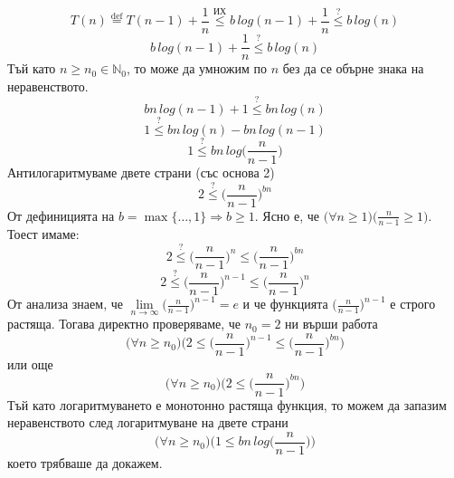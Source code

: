 \begin{solution}
\begin{itemize}
\begin{indstep}
			\begin{equation*}
				T(n)\overset{\text{def}}{=}T(n-1)+\frac1n\overset{\text{ИХ}}{\le}b\,log(n-1)+\frac1n\overset{?}{\le}b\,log(n)
			\end{equation*}
			\begin{equation*}
				b\,log(n-1)+\frac1n\overset{?}{\le}b\,log(n)
			\end{equation*}
			Тъй като $n\ge n_0\in\mathbb{N}_0$, то може да умножим по $n$ без да се обърне знака на неравенството.
			\begin{equation*}
				bn\,log(n-1)+1\overset{?}{\le}bn\,log(n)
			\end{equation*}
			\begin{equation*}
				1\overset{?}{\le}bn\,log(n)-bn\,log(n-1)
			\end{equation*}
			\begin{equation*}
				1\overset{?}{\le}bn\,log\bigg(\frac{n}{n-1}\bigg)
			\end{equation*}
			Антилогаритмуваме двете страни (със основа 2)
			\begin{equation*}
				2\overset{?}{\le}\bigg(\frac{n}{n-1}\bigg)^{bn}
			\end{equation*}
			От дефиницията на $b\!=\!\max\{\dots,1\}\Rightarrow b\ge1$. Ясно е, че $\big(\forall n\ge1\big)\big(\frac{n}{n-1}\ge1\big)$. Тоест имаме:
			\begin{equation*}
				2\overset{?}{\le}\bigg(\frac{n}{n-1}\bigg)^n\le\bigg(\frac{n}{n-1}\bigg)^{bn}
			\end{equation*}
			\begin{equation*}
				2\overset{?}{\le}\bigg(\frac{n}{n-1}\bigg)^{n-1}\le\bigg(\frac{n}{n-1}\bigg)^n
			\end{equation*}
			От анализа знаем, че $\lim\limits_{n\to\infty}\big(\frac{n}{n-1}\big)^{n-1}=e$ и че функцията $\big(\frac{n}{n-1}\big)^{n-1}$ е строго растяща. Тогава директно проверяваме, че $n_0=2$ ни върши работа%
			\begin{equation*}
				\big(\forall n\ge n_0\big)\Bigg(2\le\bigg(\frac{n}{n-1}\bigg)^{n-1}\le\bigg(\frac{n}{n-1}\bigg)^{bn}\Bigg)
			\end{equation*}
			или още
			\begin{equation*}
				\big(\forall n\ge n_0\big)\Bigg(2\le\bigg(\frac{n}{n-1}\bigg)^{bn}\Bigg)
			\end{equation*}
			Тъй като логаритмуването е монотонно растяща функция, то можем да запазим неравенството след логаритмуване на двете страни
			\begin{equation*}
				\big(\forall n\ge n_0\big)\Bigg(1\le bn\,log\bigg(\frac{n}{n-1}\bigg)\Bigg)
			\end{equation*}
			което трябваше да докажем.
		\end{indstep}
	

\end{itemize}
\end{solution}
